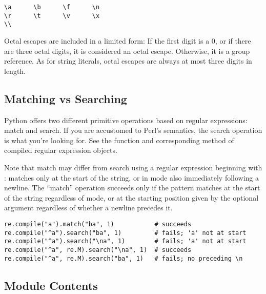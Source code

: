 \begin{verbatim}
\a      \b      \f      \n
\r      \t      \v      \x
\\
\end{verbatim}

Octal escapes are included in a limited form: If the first digit is a
0, or if there are three octal digits, it is considered an octal
escape. Otherwise, it is a group reference.  As for string literals,
octal escapes are always at most three digits in length.


\subsection{Matching vs Searching \label{matching-searching}}

Python offers two different primitive operations based on regular
expressions: match and search.  If you are accustomed to Perl's
semantics, the search operation is what you're looking for.  See the
 function and corresponding method of compiled
regular expression objects.

Note that match may differ from search using a regular expression
beginning with \character{\textasciicircum}:
\character{\textasciicircum} matches only at the
start of the string, or in  mode also immediately
following a newline.  The ``match'' operation succeeds only if the
pattern matches at the start of the string regardless of mode, or at
the starting position given by the optional  argument
regardless of whether a newline precedes it.

\begin{verbatim}
re.compile("a").match("ba", 1)           # succeeds
re.compile("^a").search("ba", 1)         # fails; 'a' not at start
re.compile("^a").search("\na", 1)        # fails; 'a' not at start
re.compile("^a", re.M).search("\na", 1)  # succeeds
re.compile("^a", re.M).search("ba", 1)   # fails; no preceding \n
\end{verbatim}


\subsection{Module Contents}

